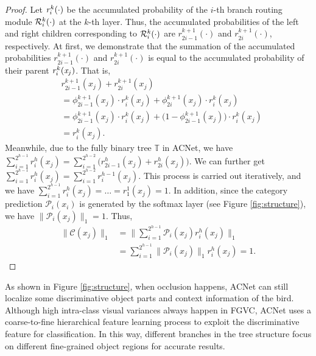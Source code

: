 \documentclass[10pt,twocolumn,letterpaper]{article}
\begin{document}
\begin{proof}
Let ${\it r}_i^{k}(\cdot)$ be the accumulated probability of the $i$-th branch routing module ${\cal R}_{i}^{k}(\cdot)$ at the $k$-th layer. Thus, the accumulated probabilities of the left and right children corresponding to ${\cal R}_{i}^{k}(\cdot)$ are $r_{2i-1}^{k+1}(\cdot)$ and $r_{2i}^{k+1}(\cdot)$, respectively. At first, we demonstrate that the summation of the accumulated probabilities $r_{2i-1}^{k+1}(\cdot)$ and $r_{2i}^{k+1}(\cdot)$ is equal to the accumulated probability of their parent ${\it r}_i^{k}({\it x}_j)$. That is, 
\begin{equation}
\begin{aligned}
        &r_{2i-1}^{k+1}(x_j) +r_{2i}^{k+1}(x_j) \\
        &= \phi_{2i-1}^{k+1}(x_j) \cdot r_i^{k}(x_j) + \phi_{2i}^{k+1}(x_j) \cdot r_i^{k}(x_j)\\
        &= \phi_{2i-1}^{k+1}(x_j) \cdot r_i^{k}(x_j) + \big(1-\phi_{2i-1}^{k+1}(x_j)\big) \cdot r_i^{k}(x_j)\\
        &= r_i^{k}(x_j).
\end{aligned}
\end{equation}
Meanwhile, due to the fully binary tree $\mathbb{T}$ in ACNet, we have $\sum_{i=1}^{2^{h-1}} r_i^{h}(x_j) = \sum_{i=1}^{2^{h-2}}\big( r_{2i-1}^{h}(x_j) +r_{2i}^{h}(x_j) \big)$. We can further get $\sum_{i=1}^{2^{h-1}} r_i^{h}(x_j) =  \sum_{i=1}^{2^{h-2}} r_i^{h-1}(x_j)$. This process is carried out iteratively, and we have $\sum_{i=1}^{2^{h-1}} r_i^{h}(x_j) = \dots = r_1^{1}(x_j) = 1$. In addition, since the category prediction $\mathcal{P}_i(x_i)$ is generated by the softmax layer (see Figure \ref{fig:structure}), we have $\|\mathcal{P}_i(x_j)\|_1 = 1$. Thus,  
\begin{equation}
\begin{array}{cl}
        \|\mathcal{C}(x_j)\|_1 &= \|\sum_{i=1}^{2^{h-1}} \mathcal{P}_i(x_j)r_i^{h}(x_j)\|_1 \\
                                          &= \sum_{i=1}^{2^{h-1}} \|\mathcal{P}_i(x_j)\|_1r_i^{h}(x_j) = 1.
\end{array}
\end{equation}
\end{proof}
As shown in Figure \ref{fig:structure}, when occlusion happens, ACNet can still localize some discriminative object parts and context information of the bird. Although high intra-class visual variances always happen in FGVC, ACNet uses a coarse-to-fine hierarchical feature learning process to exploit the discriminative feature for classification. In this way, different branches in the tree structure focus on different fine-grained object regions for accurate results.  
\end{document}
